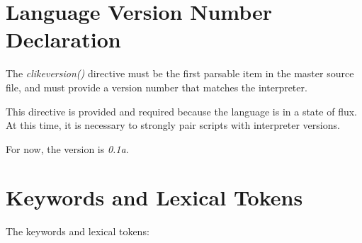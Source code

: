 \section{Language Version Number Declaration}
\label{ccik2:slvn0}

The \emph{clikeversion()} directive must be the first parsable item in the master
source file, and must provide a version number that matches the interpreter.

This directive is provided and required because the language is in a state of flux.
At this time, it is necessary to strongly pair scripts with interpreter versions.

For now, the version is \emph{0.1a}.


\section{Keywords and Lexical Tokens}
\label{ccik2:skwd0}

The keywords and lexical tokens:

